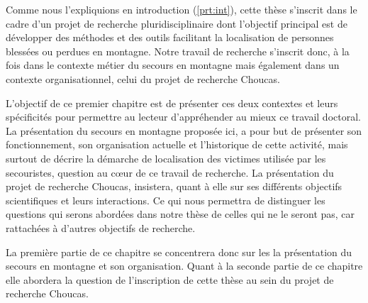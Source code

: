 Comme nous l'expliquions en introduction (\autoref{prt:int}), cette
thèse s'inscrit dans le cadre d'un projet de recherche
pluridisciplinaire dont l'objectif principal est de développer des
méthodes et des outils facilitant la localisation de personnes
blessées ou perdues en montagne. Notre travail de recherche s'inscrit
donc, à la fois dans le contexte métier du secours en montagne mais
également dans un contexte organisationnel, celui du projet de
recherche Choucas.

L'objectif de ce premier chapitre est de présenter ces deux contextes
et leurs spécificités pour permettre au lecteur d'appréhender au mieux
ce travail doctoral. La présentation du secours en montagne proposée
ici, a pour but de présenter son fonctionnement, son organisation
actuelle et l'historique de cette activité, mais surtout de décrire la
démarche de localisation des victimes utilisée par les secouristes,
question au cœur de ce travail de recherche. La présentation du projet
de recherche Choucas, insistera, quant à elle sur ses différents
objectifs scientifiques et leurs interactions. Ce qui nous permettra
de distinguer les questions qui serons abordées dans notre thèse de
celles qui ne le seront pas, car rattachées à d'autres objectifs de
recherche.

La première partie de ce chapitre se concentrera donc sur les la
présentation du secours en montagne et son organisation. Quant à la
seconde partie de ce chapitre elle abordera la question de
l'inscription de cette thèse au sein du projet de recherche Choucas.


